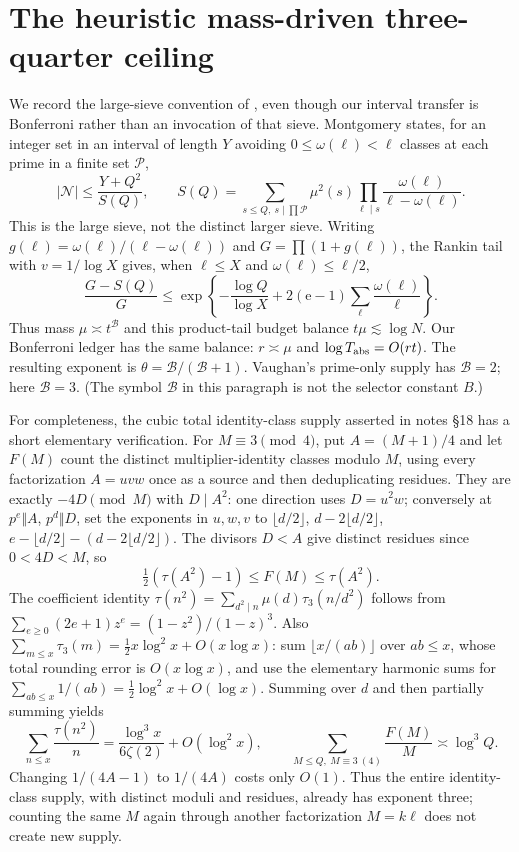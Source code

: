 \documentclass[10pt,reqno]{amsart}
\theoremstyle{remark}
\newcommand{\e}{\mathrm e}
\begin{document}
\section{The heuristic mass-driven three-quarter ceiling}\label{sec:ceiling}
We record the large-sieve convention of \cite[Section~5]{LL}, even though
our interval transfer is Bonferroni rather than an invocation of that sieve.
Montgomery \cite[\S8, p.~561]{Montgomery} states, for an integer set in an
interval of length $Y$ avoiding $0\leq\omega(\ell)<\ell$ classes at each
prime in a finite set $\mathcal P$,
\[
 |\mathcal N|\leq\frac{Y+Q^2}{S(Q)},\qquad
 S(Q)=\sum_{s\leq Q,\ s\mid\prod\mathcal P}\mu^2(s)
                   \prod_{\ell\mid s}\frac{\omega(\ell)}{\ell-\omega(\ell)}.
\]
This is the large sieve, not the distinct larger sieve.  Writing
$g(\ell)=\omega(\ell)/(\ell-\omega(\ell))$ and
$G=\prod(1+g(\ell))$, the Rankin tail with $v=1/\log X$ gives,
when $\ell\leq X$ and $\omega(\ell)\leq\ell/2$,
\[
 \frac{G-S(Q)}G\leq
 \exp\left\{-\frac{\log Q}{\log X}
                     +2(\e-1)\sum_\ell\frac{\omega(\ell)}\ell\right\}.
\]
Thus mass $\mu\asymp t^{\mathcal B}$ and this product-tail budget balance
$t\mu\lesssim\log N$.  Our Bonferroni ledger has the same balance:
$r\asymp\mu$ and $\log T_{\rm abs}=O(rt)$.
The resulting exponent is $\theta=\mathcal B/(\mathcal B+1)$.
Vaughan's prime-only supply has $\mathcal B=2$; here $\mathcal B=3$.
(The symbol $\mathcal B$ in this paragraph is not the selector constant $B$.)

For completeness, the cubic total identity-class supply asserted in notes
\S18 has a short elementary verification.  For $M\equiv3\pmod4$, put
$A=(M+1)/4$ and let $F(M)$ count the distinct multiplier-identity classes
modulo $M$, using every factorization $A=uvw$ once as a source and then
deduplicating residues.  They are exactly $-4D\pmod M$ with $D\mid A^2$:
one direction uses $D=u^2w$; conversely at $p^e\Vert A$, $p^d\Vert D$,
set the exponents in $u,w,v$ to
$\lfloor d/2\rfloor$, $d-2\lfloor d/2\rfloor$,
$e-\lfloor d/2\rfloor-(d-2\lfloor d/2\rfloor)$.
The divisors $D<A$ give distinct residues since $0<4D<M$, so
\[
 \tfrac12(\tau(A^2)-1)\leq F(M)\leq\tau(A^2).
\]
The coefficient identity
$\tau(n^2)=\sum_{d^2\mid n}\mu(d)\tau_3(n/d^2)$ follows from
$\sum_{e\geq0}(2e+1)z^e=(1-z^2)/(1-z)^3$.
Also $\sum_{m\leq x}\tau_3(m)=\frac12x\log^2x+O(x\log x)$:
sum $\lfloor x/(ab)\rfloor$ over $ab\leq x$, whose total rounding
error is $O(x\log x)$, and use the elementary harmonic sums for
$\sum_{ab\leq x}1/(ab)=\frac12\log^2x+O(\log x)$.
Summing over $d$ and then partially summing yields
\[
 \sum_{n\leq x}\frac{\tau(n^2)}n
     =\frac{\log^3x}{6\zeta(2)}+O(\log^2x),\qquad
 \sum_{M\leq Q,\ M\equiv3\ (4)}\frac{F(M)}M\asymp\log^3Q.
\]
Changing $1/(4A-1)$ to $1/(4A)$ costs only $O(1)$.
Thus the entire identity-class supply, with distinct moduli and residues,
already has exponent three; counting the same $M$ again through another
factorization $M=k\ell$ does not create new supply.
\end{document}
